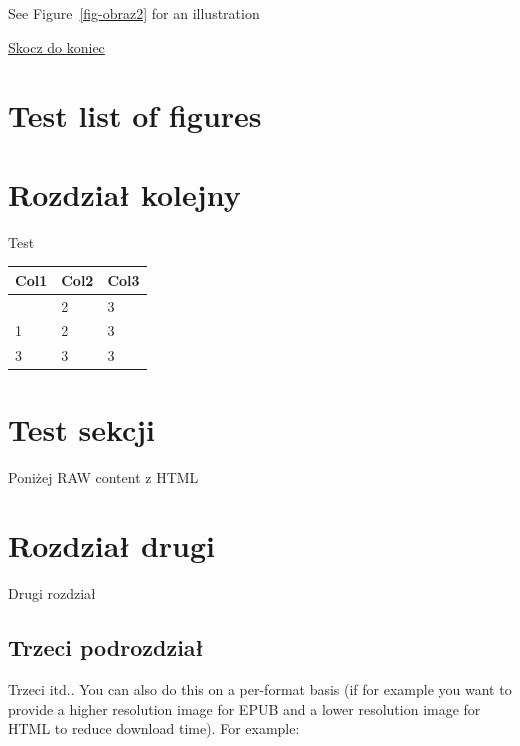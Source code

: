 \documentclass[
  a4paper,
  DIV=11,
  numbers=noendperiod,
  oneside,
  open=any]{scrreprt}
\begin{document}
See Figure~\ref{fig-obraz2} for an illustration

\hyperref[koniec]{Skocz do koniec}

\section{Test list of figures}\label{test-list-of-figures}

\listoffigures

\section{Rozdział kolejny}\label{rozdziaux142-kolejny}

Test

\begin{longtable}[]{@{}lll@{}}
\toprule\noalign{}
Col1 & Col2 & Col3 \\
\midrule\noalign{}
\endhead
\bottomrule\noalign{}
\endlastfoot
1 & 2 & 3 \\
1 & 2 & 3 \\
3 & 3 & 3 \\
\end{longtable}

\section{Test sekcji}\label{test-sekcji}

Poniżej RAW content z HTML

\section{Rozdział drugi}\label{rozdziaux142-drugi}

Drugi rozdział

\subsection{Trzeci podrozdział}\label{trzeci-podrozdziaux142}

Trzeci itd.. You can also do this on a per-format basis (if for example
you want to provide a higher resolution image for EPUB and a lower
resolution image for HTML to reduce download time). For example:

{}
\end{document}
